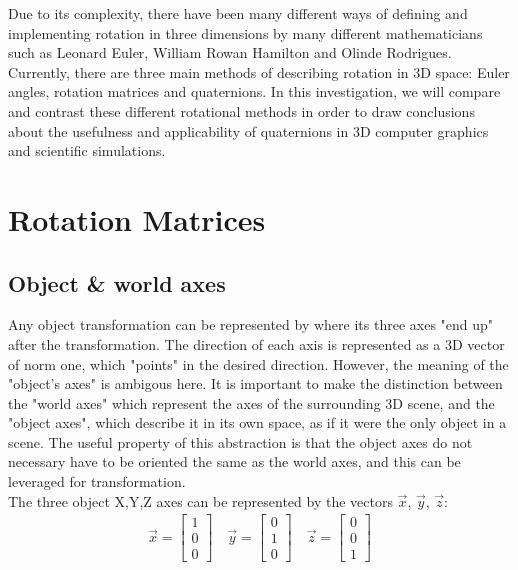 \documentclass[12pt, a4paper]{article}
\begin{document}
Due to its complexity, there have been many different ways of defining and
implementing rotation in three dimensions by many different mathematicians such
as Leonard Euler, William Rowan Hamilton and Olinde Rodrigues. \\

Currently, there are three main methods of describing rotation in 3D space:
Euler angles, rotation matrices and quaternions. In this investigation, we will
compare and contrast these different rotational methods in order to draw
conclusions about the usefulness and applicability of quaternions in 3D computer
graphics and scientific simulations.

\section{Rotation Matrices}
\subsection{Object \& world axes}
Any object transformation can be represented by where its three axes "end up"
after the transformation. The direction of each axis is represented as a 3D
vector of norm one, which "points" in the desired direction. However, the
meaning of the "object's axes" is ambigous here. It is important to make the
distinction between the "world axes" which represent the axes of the surrounding
3D scene, and the "object axes", which describe it in its own space, as if it
were the only object in a scene. The useful property of this abstraction is that
the object axes do not necessary have to be oriented the same as the world axes,
and this can be leveraged for transformation. \\

The three object X,Y,Z axes can be represented by the vectors
$\vec{x}$, $\vec{y}$, $\vec{z}$: \\

\begin{align*}
    \vec{x} = \begin{bmatrix} 1 \\ 0 \\ 0 \end{bmatrix}
    \quad
    \vec{y} = \begin{bmatrix} 0 \\ 1 \\ 0 \end{bmatrix}
    \quad
    \vec{z} = \begin{bmatrix} 0 \\ 0 \\ 1 \end{bmatrix}
\end{align*} \\
\end{document}
